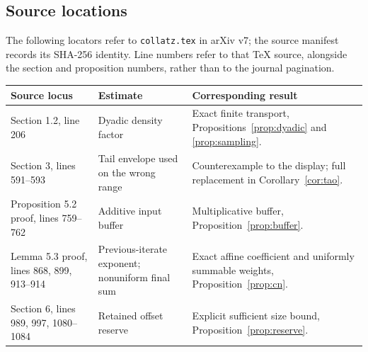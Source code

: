 \subsection{Source locations}

The following locators refer to \texttt{collatz.tex} in arXiv v7; the
source manifest records its SHA-256 identity.  Line numbers refer to that
TeX source, alongside the section and proposition numbers, rather than
to the journal pagination.

\begin{center}\small
\begin{tabular}{@{}>{\raggedright\arraybackslash}p{}>{\raggedright\arraybackslash}p{}>{\raggedright\arraybackslash}p{}@{}}
\toprule
Source locus & Estimate & Corresponding result\\
\midrule
Section 1.2, line 206 & Dyadic density factor & Exact finite transport,
Propositions~\ref{prop:dyadic} and \ref{prop:sampling}.\\[4pt]
Section 3, lines 591--593 & Tail envelope used on the wrong range &
Counterexample to the display; full replacement in
Corollary~\ref{cor:tao}.\\[4pt]
Proposition 5.2 proof, lines 759--762 & Additive input buffer &
Multiplicative buffer, Proposition~\ref{prop:buffer}.\\[4pt]
Lemma 5.3 proof, lines 868, 899, 913--914 & Previous-iterate exponent;
nonuniform final sum & Exact affine coefficient and uniformly summable
weights, Proposition~\ref{prop:cn}.\\[4pt]
Section 6, lines 989, 997, 1080--1084 & Retained offset reserve &
Explicit sufficient size bound,
Proposition~\ref{prop:reserve}.\\
\bottomrule
\end{tabular}
\end{center}
